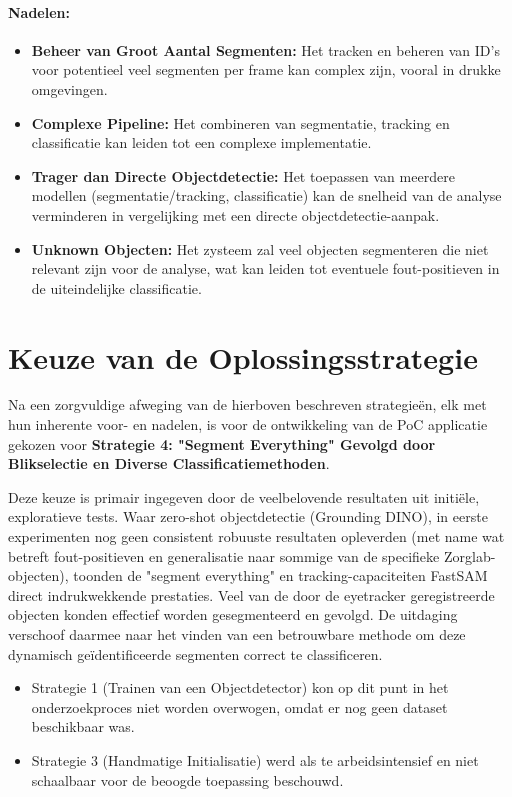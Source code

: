 \paragraph{Nadelen:}
\begin{itemize}
    \item \textbf{Beheer van Groot Aantal Segmenten:} Het tracken en beheren van ID's voor potentieel veel segmenten per frame kan complex zijn, vooral in drukke omgevingen.
    \item \textbf{Complexe Pipeline:} Het combineren van segmentatie, tracking en classificatie kan leiden tot een complexe implementatie.
    \item \textbf{Trager dan Directe Objectdetectie:} Het toepassen van meerdere modellen (segmentatie/tracking, classificatie) kan de snelheid van de analyse verminderen in vergelijking met een directe objectdetectie-aanpak.
    \item \textbf{Unknown Objecten:} Het zysteem zal veel objecten segmenteren die niet relevant zijn voor de analyse, wat kan leiden tot eventuele fout-positieven in de uiteindelijke classificatie.
\end{itemize}

\section{Keuze van de Oplossingsstrategie}

Na een zorgvuldige afweging van de hierboven beschreven strategieën, elk met hun inherente voor- en nadelen, is voor de ontwikkeling van de PoC 
applicatie gekozen voor \textbf{Strategie 4: "Segment Everything" Gevolgd door Blikselectie en Diverse Classificatiemethoden}.

Deze keuze is primair ingegeven door de veelbelovende resultaten uit initiële, exploratieve tests. 
Waar zero-shot objectdetectie (Grounding DINO), in eerste experimenten nog geen consistent robuuste resultaten opleverden 
(met name wat betreft fout-positieven en generalisatie naar sommige van de specifieke Zorglab-objecten), 
toonden de "segment everything" en tracking-capaciteiten FastSAM direct indrukwekkende prestaties.
Veel van de door de eyetracker geregistreerde objecten konden effectief worden gesegmenteerd en gevolgd. 
De uitdaging verschoof daarmee naar het vinden van een betrouwbare methode om deze dynamisch geïdentificeerde segmenten correct te classificeren.

\begin{itemize}
    \item Strategie 1 (Trainen van een Objectdetector) kon op dit punt in het onderzoekproces niet worden overwogen, omdat er nog geen dataset beschikbaar was.
    \item Strategie 3 (Handmatige Initialisatie) werd als te arbeidsintensief en niet schaalbaar voor de beoogde toepassing beschouwd.
\end{itemize}

